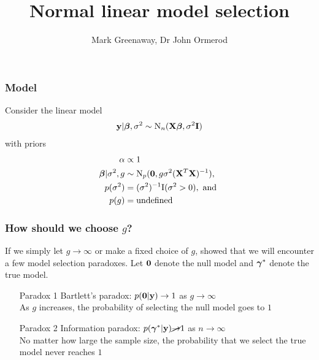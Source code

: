 \documentclass{beamer}
\title{Normal linear model selection}
\author{Mark Greenaway, Dr John Ormerod}
\begin{document}
\begin{frame}
	\titlepage
\end{frame}
			
\begin{frame}
	\frametitle{Model}
	Consider the linear model
	\begin{align*}
		{\bf y} | {\boldsymbol \beta}, \sigma^2 \sim \text{N}_n({\bf X} {\boldsymbol \beta}, \sigma^2 {\bf I}) 
	\end{align*}
	with priors
	\begin{align*}
		\alpha & \propto 1 \\
		{\boldsymbol \beta} | \sigma^2, g & \sim \text{N}_p({\bf 0}, g \sigma^2 ({\bf X}^T {\bf X})^{-1}),                     \\
		p(\sigma^2)          & = (\sigma^2)^{-1} \text{I}(\sigma^2 > 0), \text{ and }                    \\
		p(g)                 & = \text{undefined}
	\end{align*}
\end{frame}

\begin{frame}
	\frametitle{How should we choose $g$?}

	If we simply let $g \to \infty$ or make a fixed choice of $g$, \citep{Liang2008} showed that we will
	encounter a few model selection paradoxes.
	Let ${\bf 0}$ denote the null model and ${\boldsymbol \gamma}^*$ denote the true model.

	\begin{itemize}
		\setlength{\itemindent}{3.0em}
		\item[Paradox 1] Bartlett's paradox: $p({\bf 0} | {\bf y}) \to 1$ as $g \to \infty$ \\
					As $g$ increases, the probability of selecting the null model goes to $1$
		\item[Paradox 2] Information paradox: $p({\boldsymbol \gamma}^* | {\bf y}) \cancel{\to} 1$ as $n \to \infty$ \\
					No matter how large the sample size, the probability that we select the true model never
					reaches $1$
	\end{itemize}

\end{frame}
\end{document}
